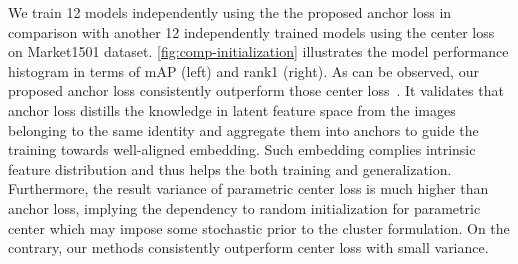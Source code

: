 \documentclass[runningheads]{llncs}
\begin{document}
We train 12 models independently using the the proposed anchor loss in comparison with another 12 independently trained models using the center loss~\cite{wen-centerloss} on Market1501 dataset.
\cref{fig:comp-initialization} illustrates the model performance histogram in terms of mAP  (left) and rank1 (right). As can be observed, our proposed anchor loss consistently outperform those center loss~\cite{wen-centerloss}. It validates that anchor loss distills the knowledge in latent feature space from the images belonging to the same identity and aggregate them into anchors to guide the training towards well-aligned embedding. Such embedding complies intrinsic feature distribution and thus helps the both training and generalization. Furthermore, the result variance of parametric center loss is much higher than anchor loss, implying the dependency to random initialization for parametric center which may impose some stochastic prior to the cluster formulation. On the contrary, our methods consistently outperform center loss with small variance.

\begin{table}[t]
    \centering
    \caption{Comparison with SOTA on CUHK03: CUHK03 evaluation with the setting of 767/700 training/test split on both the labeled and detected images. * denotes our implementation.}
    \label{tab:comp-cuhk}
    \vspace*{-0.38cm}
\end{table}
\end{document}
